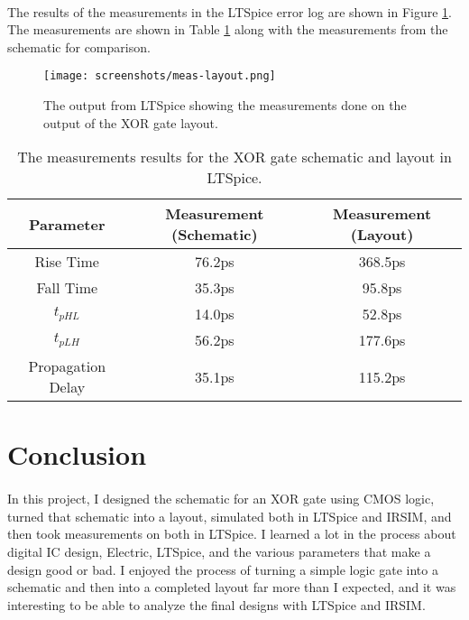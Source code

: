 \documentclass{article}
\begin{document}
  \paragraph{}
  The results of the measurements in the LTSpice error log are shown in Figure \ref{fig:meas-lay}. The measurements are shown in Table \ref{table:meas-lay} along with the measurements from the schematic for comparison.


  \begin{figure}[H]
    \centering
    \texttt{[image: screenshots/meas-layout.png]}
    \caption{The output from LTSpice showing the measurements done on the output of the XOR gate layout.}
    \label{fig:meas-lay}
  \end{figure}



  \begin{table}[H]
    \centering
    \footnotesize
    \begin{tabular}{|c|c|c|}
      \hline
      \textbf{Parameter} & \textbf{Measurement (Schematic)} & \textbf{Measurement (Layout)} \\
      \hline
      Rise Time & 76.2ps & 368.5ps\\
      \hline
      Fall Time & 35.3ps & 95.8ps\\
      \hline
      $t_{pHL}$ & 14.0ps & 52.8ps \\
      \hline
      $t_{pLH}$ & 56.2ps & 177.6ps\\
      \hline
      Propagation Delay & 35.1ps & 115.2ps \\
      \hline
    \end{tabular}
    \caption{The measurements results for the XOR gate schematic and layout in LTSpice.}
    \label{table:meas-lay}
  \end{table}


\section{Conclusion}
  \paragraph{}
  In this project, I designed the schematic for an XOR gate using CMOS logic, turned that schematic into a layout, simulated both in LTSpice and IRSIM, and then took measurements on both in LTSpice. I learned a lot in the process about digital IC design, Electric, LTSpice, and the various parameters that make a design good or bad. I enjoyed the process of turning a simple logic gate into a schematic and then into a completed layout far more than I expected, and it was interesting to be able to analyze the final designs with LTSpice and IRSIM. 
\end{document}
